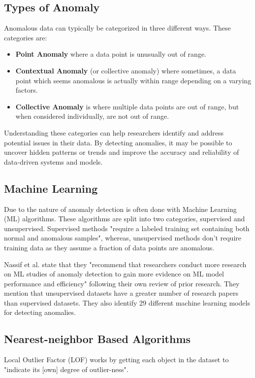 \documentclass[journal]{IEEEtran}
\begin{document}
\subsection{Types of Anomaly}
\noindent Anomalous data can typically be categorized in three different ways\cite{Ahmed2016}\cite{Bhuyan2013}. These categories are:
\begin{itemize}
    \item \textbf{Point Anomaly} where a data point is unusually out of range.
    \item \textbf{Contextual Anomaly} (or collective anomaly\cite{Song2007}) where sometimes, a data point which seems anomalous is actually within range depending on a varying factors.
    \item \textbf{Collective Anomaly} is where multiple data points are out of range, but when considered individually, are not out of range.
\end{itemize}
Understanding these categories can help researchers identify and address potential issues in their data. By detecting anomalies, it may be possible to uncover hidden patterns or trends and improve the accuracy and reliability of data-driven systems and models.

\subsection{Machine Learning}
\noindent Due to the nature of anomaly detection is often done with Machine Learning (ML) algorithms\cite{Omar2013}\cite{Misra2020}\cite{Zong2018}. These algorithms are split into two categories, supervised and unsupervised\cite{Omar2013}. Supervised methods "require a labeled training set containing both normal and anomalous samples", whereas, unsupervised methods don't require training data as they assume a fraction of data points are anomalous\cite{Omar2013}.

Nassif et al. state that they "recommend that researchers conduct more research on ML studies of anomaly detection to gain more evidence on ML model performance and efficiency" following their own review of prior research. They mention that unsupervised datasets have a greater number of research papers than supervised datasets. They also identify 29 different machine learning models for detecting anomalies\cite{Nassif2021}.

\subsection{Nearest-neighbor Based Algorithms}
\noindent Local Outlier Factor (LOF) works by getting each object in the dataset to "indicate its [own] degree of outlier-ness"\cite{Breunig2000}.
\end{document}
